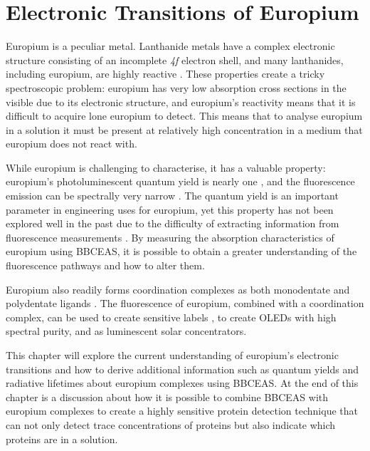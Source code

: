 \chapter{Electronic Transitions of Europium}\label{ch:eu_theory}

Europium is a peculiar metal. Lanthanide metals have a complex
electronic structure consisting of an incomplete \textsl{4f} electron
shell, and many lanthanides, including europium, are highly reactive
\cite{Cooley:1946tv,Rard:1985tb}. These properties create a tricky
spectroscopic problem: europium has very low absorption cross sections in the
visible due to its electronic structure, and europium's reactivity means that
it is difficult to acquire lone europium to detect. This means that to analyse
europium in a solution it must be present at relatively high concentration in
a medium that europium does not react with.


While europium is challenging to characterise, it has a valuable
property: europium's photoluminescent quantum yield is nearly one
\cite{Scotognella:2009jo,Moudam:2009in, Bunzli:2005ic}, and the fluorescence
emission can be spectrally very narrow \cite{Werts:2002fs}. The quantum yield
is an important parameter in engineering uses for europium, yet this property
has not been explored well in the past due to the difficulty of extracting
information from fluorescence measurements \cite{Werts:2002fs}. By measuring
the absorption characteristics of europium using \ac{BBCEAS}, it is possible to
obtain a greater understanding of the fluorescence pathways and how to alter
them.

Europium also readily forms coordination complexes as both monodentate and
polydentate ligands
\cite{Kirby:1983cl,Sveshnikova:2000cr,Werts:2002fs,Bunzli:2005ic,Scotognella:2009jo,Moudam:2009in}. The fluorescence of europium, combined with a coordination complex, can be used
to create sensitive labels
\cite{Harma:2010dm,Pihlasalo:2010el,InstituteofBiomedicine:2011vt,Pihlasalo:2011ju,Pihlasalo:2012cq,Pihlasalo:2012en},
to create OLEDs with high spectral purity\cite{Moudam:2009in}, and as
luminescent solar concentrators\cite{Moudam:2009in,Wilson:2010hs}.

This chapter will explore the current understanding of europium's electronic
transitions and how to derive additional information such as quantum yields
and radiative lifetimes about europium complexes using \ac{BBCEAS}. At the
end of this chapter is a discussion about how it is possible to combine
\ac{BBCEAS} with europium complexes to create a highly sensitive protein
detection technique that can not only detect trace concentrations of proteins
but also indicate which proteins are in a solution.



